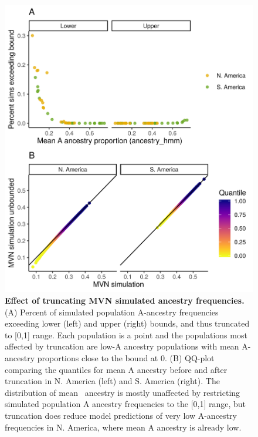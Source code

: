 \begin{figure}[ht]
\includegraphics[width=.85\textwidth]{chapter1/figures/effect_truncation_on_MVN.png}
\caption{ \textbf{Effect of truncating MVN simulated ancestry frequencies.} (A) Percent of simulated population A-ancestry frequencies exceeding lower (left) and upper (right) bounds, and thus truncated to [0,1] range. Each population is a point and the populations most affected by truncation are low-A ancestry populations with mean A-ancestry proportions close to the bound at 0. (B) QQ-plot comparing the quantiles for mean A ancestry before and after truncation in N. America (left) and S. America (right). The distribution of mean \A\ ancestry is mostly unaffected by restricting simulated population A ancestry frequencies to the [0,1] range, but truncation does reduce model predictions of very low A-ancestry frequencies in N. America, where mean A ancestry is already low.}
\label{effect_truncation_mvn}
\end{figure}

